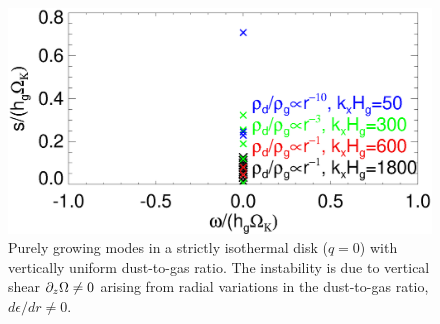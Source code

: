 \begin{figure}
  \includegraphics[width=\linewidth]{figures/vert_mixed_modes} 
  \caption{Purely growing modes in a strictly isothermal disk ($q=0$) with
    vertically uniform dust-to-gas ratio. The instability is due to 
    vertical shear $\partial_z\Omega\neq0$ arising from radial variations in
    the dust-to-gas ratio, $d\epsilon/dr\neq 0$. \label{vert_mixed_modes}
    }
\end{figure}




